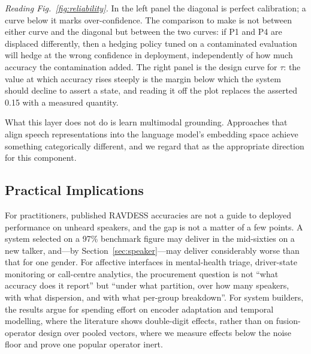 \documentclass[journal,onecolumn,11pt,draftclsnofoot]{IEEEtran}   %
\begin{document}
\emph{Reading Fig.~\ref{fig:reliability}.} In the left panel the diagonal is
perfect calibration; a curve below it marks over-confidence. The comparison to
make is not between either curve and the diagonal but between the two curves:
if P1 and P4 are displaced differently, then a hedging policy tuned on a
contaminated evaluation will hedge at the wrong confidence in deployment,
independently of how much accuracy the contamination added. The right panel is
the design curve for $\tau$: the value at which accuracy rises steeply is the
margin below which the system should decline to assert a state, and reading it
off the plot replaces the asserted 0.15 with a measured quantity.

What this layer does not do is learn multimodal grounding. Approaches that align
speech representations into the language model's embedding space
\cite{kang2025frozen,kim2024paralinguistics} achieve something categorically
different, and we regard that as the appropriate direction for this component.

\subsection{Practical Implications}
For practitioners, published RAVDESS accuracies are not a guide to deployed
performance on unheard speakers, and the gap is not a matter of a few points. A
system selected on a 97\% benchmark figure may deliver in the mid-sixties on a
new talker, and---by Section~\ref{sec:speaker}---may deliver considerably worse
than that for one gender. For affective interfaces in mental-health triage,
driver-state monitoring or call-centre analytics, the procurement question is
not ``what accuracy does it report'' but ``under what partition, over how many
speakers, with what dispersion, and with what per-group breakdown''. For system
builders, the results argue for spending effort on encoder adaptation and
temporal modelling, where the literature shows double-digit effects, rather than
on fusion-operator design over pooled vectors, where we measure effects below
the noise floor and prove one popular operator inert.
\end{document}
